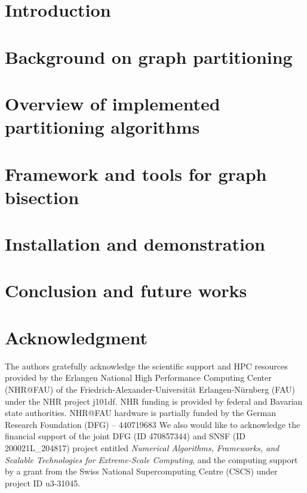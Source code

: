 \documentclass{juliacon}
\begin{document}


\maketitle

\begin{abstract}
    
\end{abstract}

\section{Introduction}
    

\section{Background on graph partitioning}
    \label{sec:background}
    

\section{Overview of implemented partitioning algorithms}
    \label{sec:algo}
    

\section{Framework and tools for graph bisection}
    \label{sec:framwork}
    

\section{Installation and demonstration}
    \label{sec:demo}
    


\section{Conclusion and future works}
    \label{sec:conclusion}
    
\FloatBarrier
\section{Acknowledgment}
The authors gratefully acknowledge the scientific support and HPC resources provided by the Erlangen National High Performance Computing Center (NHR@FAU) of the Friedrich-Alexander-Universität Erlangen-Nürnberg (FAU) under the NHR project j101df. NHR funding is provided by federal and Bavarian state authorities. NHR@FAU hardware is partially funded by the German Research Foundation (DFG) – 440719683
We also would like to acknowledge the financial support of the joint DFG (ID 470857344) and
SNSF (ID 200021L\_204817) project entitled \textit{Numerical Algorithms, Frameworks, and Scalable Technologies for Extreme-Scale Computing}, and the computing  support by a grant from the Swiss National Supercomputing Centre (CSCS)
under project ID u3-31045.


\end{document}
